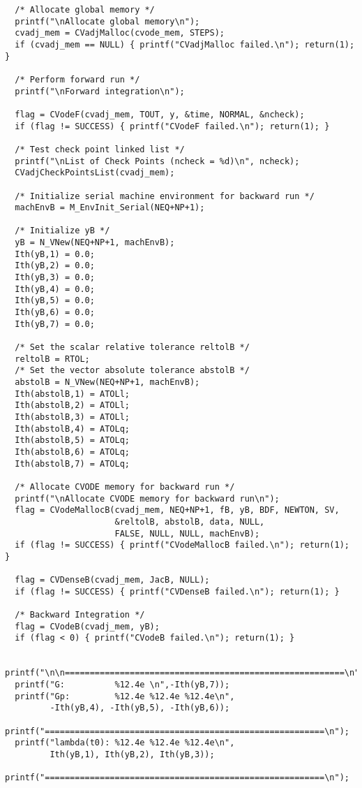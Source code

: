 \begin{verbatim}
  /* Allocate global memory */
  printf("\nAllocate global memory\n");
  cvadj_mem = CVadjMalloc(cvode_mem, STEPS);
  if (cvadj_mem == NULL) { printf("CVadjMalloc failed.\n"); return(1); }

  /* Perform forward run */
  printf("\nForward integration\n");
  
  flag = CVodeF(cvadj_mem, TOUT, y, &time, NORMAL, &ncheck);
  if (flag != SUCCESS) { printf("CVodeF failed.\n"); return(1); }

  /* Test check point linked list */
  printf("\nList of Check Points (ncheck = %d)\n", ncheck);
  CVadjCheckPointsList(cvadj_mem);

  /* Initialize serial machine environment for backward run */ 
  machEnvB = M_EnvInit_Serial(NEQ+NP+1);

  /* Initialize yB */
  yB = N_VNew(NEQ+NP+1, machEnvB);
  Ith(yB,1) = 0.0;
  Ith(yB,2) = 0.0;
  Ith(yB,3) = 0.0;
  Ith(yB,4) = 0.0;
  Ith(yB,5) = 0.0;
  Ith(yB,6) = 0.0;
  Ith(yB,7) = 0.0;

  /* Set the scalar relative tolerance reltolB */
  reltolB = RTOL;               
  /* Set the vector absolute tolerance abstolB */
  abstolB = N_VNew(NEQ+NP+1, machEnvB); 
  Ith(abstolB,1) = ATOLl;       
  Ith(abstolB,2) = ATOLl;
  Ith(abstolB,3) = ATOLl;
  Ith(abstolB,4) = ATOLq;
  Ith(abstolB,5) = ATOLq;
  Ith(abstolB,6) = ATOLq;
  Ith(abstolB,7) = ATOLq;

  /* Allocate CVODE memory for backward run */
  printf("\nAllocate CVODE memory for backward run\n");
  flag = CVodeMallocB(cvadj_mem, NEQ+NP+1, fB, yB, BDF, NEWTON, SV, 
                      &reltolB, abstolB, data, NULL, 
                      FALSE, NULL, NULL, machEnvB);
  if (flag != SUCCESS) { printf("CVodeMallocB failed.\n"); return(1); }

  flag = CVDenseB(cvadj_mem, JacB, NULL);
  if (flag != SUCCESS) { printf("CVDenseB failed.\n"); return(1); }

  /* Backward Integration */
  flag = CVodeB(cvadj_mem, yB);
  if (flag < 0) { printf("CVodeB failed.\n"); return(1); }

  printf("\n\n========================================================\n");
  printf("G:          %12.4e \n",-Ith(yB,7));
  printf("Gp:         %12.4e %12.4e %12.4e\n", 
         -Ith(yB,4), -Ith(yB,5), -Ith(yB,6));
  printf("========================================================\n");
  printf("lambda(t0): %12.4e %12.4e %12.4e\n", 
         Ith(yB,1), Ith(yB,2), Ith(yB,3));
  printf("========================================================\n");


\end{verbatim}
